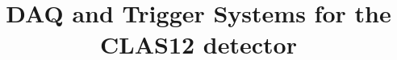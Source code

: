 \thispagestyle{empty}

\begin{center}
\title{DAQ and Trigger Systems for the CLAS12 detector}
\date{}


\maketitle







\end{center}


